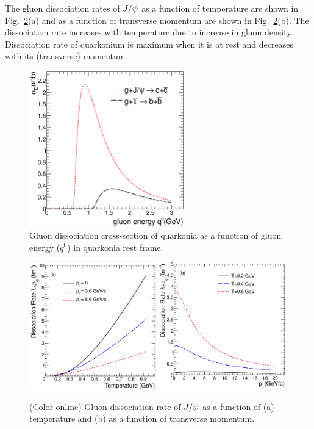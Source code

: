 \documentclass[aps,prc,preprint,superscriptaddress,showpacs,showkeys]{revtex4-1}
\begin{document}
  The gluon dissociation rates of $J/\psi$ as a function of temperature are shown in 
Fig.~\ref{fig:DRateVsTempAndPt}(a) and as a function of transverse momentum are
 shown in Fig.~\ref{fig:DRateVsTempAndPt}(b).
The dissociation rate increases with temperature due to increase in gluon density. 
Dissociation rate of quarkonium is maximum when it is at rest and decreases with 
its (transverse) momentum.


\begin{figure}
\includegraphics[width=0.60\textwidth]{Figures/Fig2_SigmaDq0.eps}
\caption{Gluon dissociation cross-section of quarkonia as a function of gluon energy ($q^{0}$) in
quarkonia rest frame.}
\label{fig:SigmaDQ0}
\end{figure}

\begin{figure}
\includegraphics[width=0.49\textwidth]{Figures/Fig3a_DRateVsT.eps}
\includegraphics[width=0.49\textwidth]{Figures/Fig3b_DRateVsPt.eps}
\caption{(Color online) Gluon dissociation rate of $J/\psi$ as a function of (a) temperature and  
(b) as a function of transverse momentum.}
\label{fig:DRateVsTempAndPt}
\end{figure}
\end{document}
